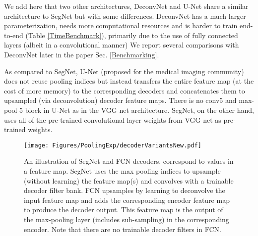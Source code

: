 \documentclass[10pt,journal,compsoc]{IEEEtran}
\begin{document}
We add here that two other architectures, DeconvNet \cite{NohDeconvNets} and U-Net \cite{ronneberger2015u} share a similar architecture to SegNet but with some differences. DeconvNet has a much larger parameterization, needs more computational resources and is harder to train end-to-end (Table \ref{TimeBenchmark}), primarily due to the use of fully connected layers (albeit in a convolutional manner) We report several comparisons with DeconvNet later in the paper Sec. \ref{Benchmarking}. 

As compared to SegNet, U-Net \cite{ronneberger2015u} (proposed for the medical imaging community) does not reuse pooling indices but instead transfers the entire feature map (at the cost of more memory) to the corresponding decoders and concatenates them to upsampled (via deconvolution) decoder feature maps. There is no conv5 and max-pool 5 block in U-Net as in the VGG net architecture. SegNet, on the other hand, uses all of the pre-trained convolutional layer weights from VGG net as pre-trained weights.


\begin{figure*}
\centering
\texttt{[image: Figures/PoolingExp/decoderVariantsNew.pdf]}
\caption{\footnotesize{An illustration of SegNet and FCN \cite{FCN} decoders.  correspond to values in a feature map. SegNet uses the max pooling indices to upsample (without learning) the feature map(s) and convolves with a trainable decoder filter bank. FCN upsamples by learning to deconvolve the input feature map and adds the corresponding encoder feature map to produce the decoder output. This feature map is the output of the max-pooling layer (includes sub-sampling) in the corresponding encoder. Note that there are no trainable decoder filters in FCN.}}
\label{Upsampling}
\end{figure*}
\end{document}
